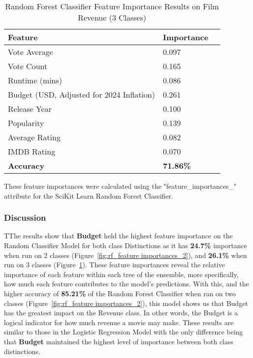 \documentclass{article}
\begin{document}
 \begin{table}[H]
    \centering
    \begin{tabular}{|l|l|l|}
        \hline
        \textbf{Feature} & \textbf{Importance} \\ \hline
        Vote Average & 0.097 \\ \hline
        Vote Count & 0.165 \\ \hline
        Runtime (mins) & 0.086 \\ \hline
        Budget (USD, Adjusted for 2024 Inflation) & 0.261 \\ \hline
        Release Year & 0.100 \\ \hline
        Popularity & 0.139 \\ \hline
        Average Rating & 0.082 \\ \hline
        IMDB Rating & 0.070 \\ \hline
        \hline
        \textbf{Accuracy} & \textbf{71.86\%} \\ \hline
    \end{tabular}
    \caption{Random Forest Classifier Feature Importance Results on Film Revenue (3 Classes)}
    \label{fig:rf_feature importances_3}
\end{table}

These feature importances were calculated using the "feature\_importances\_" attribute for the SciKit Learn Random Forest Classifier.

\subsubsection{Discussion}
TThe results show that \textbf{Budget} held the highest feature importance on the Random Classifier Model for both class Distinctions as it has \textbf{24.7\%} importance when run on 2 classes (Figure~\ref{fig:rf_feature importances_2}), and \textbf{26.1\%} when run on 3 classes (Figure~\ref{fig:rf_feature importances_3}). These feature importances reveal the relative importance of each feature within each tree of the ensemble, more specifically, how much each feature contributes to the model’s predictions. With this, and the higher accuracy of \textbf{85.21\%} of the Random Forest Classifier when ran on two classes (Figure~\ref{fig:rf_feature importances_2}), this model shows us that Budget has the greatest impact on the Revenue class. In other words, the Budget is a logical indicator for how much revenue a movie may make. These results are similar to those in the Logistic Regression Model with the only difference being that \textbf{Budget} maintained the highest level of importance between both class distinctions. 
\end{document}
